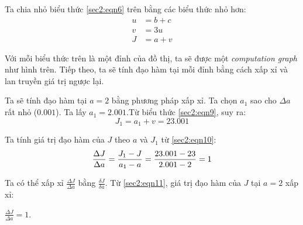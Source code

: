 Ta chia nhỏ biểu thức \ref{sec2:eqn6} trên bằng các biểu thức nhỏ hơn:
\begin{align}
\label{sec2:eqn7}
u &= b + c\\
\label{sec2:eqn8}
v &= 3u\\
\label{sec2:eqn9}
J &= a + v
\end{align}

Với mỗi biểu thức trên là một đỉnh của đồ thị, ta sẽ được một \textit{computation graph} như hình trên. Tiếp theo, ta sẽ tính đạo hàm tại mỗi đỉnh bằng cách xấp xỉ và lan truyền giá trị ngược lại.

Ta sẽ tính đạo hàm tại $a=2$ bằng phương pháp xấp xỉ. Ta chọn $a_{1}$ sao cho $\Delta a$ rất nhỏ ($0.001$). Ta lấy $a_{1} = 2.001$.Từ biểu thức \ref{sec2:eqn9}, suy ra:
\begin{equation}
\label{sec2:eqn10}
J_{1} = a_{1} + v = 23.001
\end{equation}

Ta tính giá trị đạo hàm của $J$ theo $a$ và $J_{1}$ từ \ref{sec2:eqn10}:
\begin{equation}
\label{sec2:eqn11}
\frac{\Delta J}{\Delta a} = \frac{J_{1} - J}{a_{1} - a} = \frac{23.001-23}{2.001-2} = 1\\
\end{equation}

Ta có thể xấp xỉ $\frac{\Delta J}{\Delta a}$ bằng $\frac{\delta J}{\delta a}$. Từ \ref{sec2:eqn11}, giá trị đạo hàm của $J$ tại $a=2$ xấp xỉ:
\begin{center}
$\frac{\Delta J}{\Delta a} = 1$.\\
\end{center}

